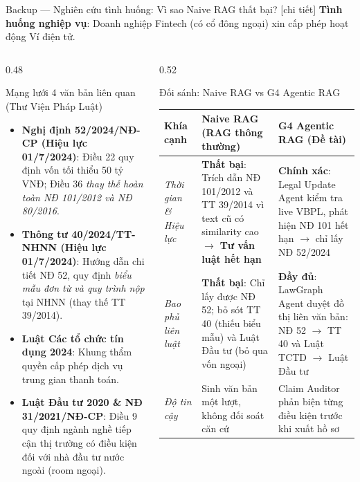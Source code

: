 \documentclass[aspectratio=169,10pt]{beamer}
\begin{document}
\begin{frame}{Backup --- Nghiên cứu tình huống: Vì sao Naive RAG thất bại? [chi tiết]}
\footnotesize
\textbf{Tình huống nghiệp vụ}: Doanh nghiệp Fintech (có cổ đông ngoại) xin cấp phép hoạt động Ví điện tử.
\vskip0.15cm
\begin{columns}[T]
\begin{column}{0.48\textwidth}
\begin{block}{\small Mạng lưới 4 văn bản liên quan (Thư Viện Pháp Luật)}
\scriptsize
\begin{itemize}
  \item \textbf{Nghị định 52/2024/NĐ-CP (Hiệu lực 01/7/2024)}:
    Điều 22 quy định vốn tối thiểu 50 tỷ VNĐ; Điều 36 \textit{thay thế hoàn toàn NĐ 101/2012 và NĐ 80/2016}.
  \item \textbf{Thông tư 40/2024/TT-NHNN (Hiệu lực 01/7/2024)}:
    Hướng dẫn chi tiết NĐ 52, quy định \textit{biểu mẫu đơn từ và quy trình nộp} tại NHNN (thay thế TT 39/2014).
  \item \textbf{Luật Các tổ chức tín dụng 2024}:
    Khung thẩm quyền cấp phép dịch vụ trung gian thanh toán.
  \item \textbf{Luật Đầu tư 2020 \& NĐ 31/2021/NĐ-CP}:
    Điều 9 quy định ngành nghề tiếp cận thị trường có điều kiện đối với nhà đầu tư nước ngoài (room ngoại).
\end{itemize}
\end{block}
\end{column}

\begin{column}{0.52\textwidth}
\begin{block}{\small Đối sánh: Naive RAG vs G4 Agentic RAG}
\scriptsize
\begin{tabular}{@{}p{1.7cm}p{2.3cm}p{2.7cm}@{}}
\toprule
\textbf{Khía cạnh} & \textbf{Naive RAG (RAG thông thường)} & \textbf{G4 Agentic RAG (Đề tài)} \\ \midrule
\textit{Thời gian \& Hiệu lực} & \textcolor{red!75!black}{\textbf{Thất bại}}: Trích dẫn NĐ 101/2012 và TT 39/2014 vì text cũ có similarity cao $\rightarrow$ \textbf{Tư vấn luật hết hạn} & \textcolor{green!55!black}{\textbf{Chính xác}}: Legal Update Agent kiểm tra live VBPL, phát hiện NĐ 101 hết hạn $\rightarrow$ chỉ lấy NĐ 52/2024 \\ \addlinespace
\textit{Bao phủ liên luật} & \textcolor{red!75!black}{\textbf{Thất bại}}: Chỉ lấy được NĐ 52; bỏ sót TT 40 (thiếu biểu mẫu) và Luật Đầu tư (bỏ qua vốn ngoại) & \textcolor{green!55!black}{\textbf{Đầy đủ}}: LawGraph Agent duyệt đồ thị liên văn bản: NĐ 52 $\rightarrow$ TT 40 và Luật TCTD $\rightarrow$ Luật Đầu tư \\ \addlinespace
\textit{Độ tin cậy} & Sinh văn bản một lượt, không đối soát căn cứ & Claim Auditor phản biện từng điều kiện trước khi xuất hồ sơ \\
\bottomrule
\end{tabular}
\end{block}
\end{column}
\end{columns}
\end{frame}
\end{document}
